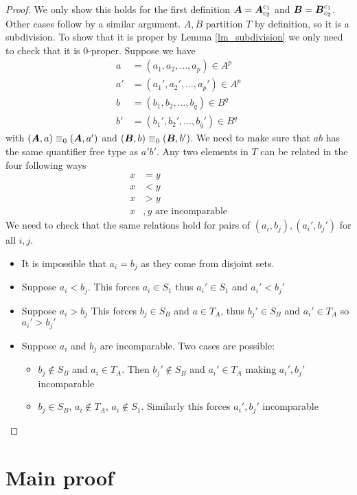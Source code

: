 \documentclass{amsart}
\DeclareMathOperator{\A}{\boldface A}
\DeclareMathOperator{\B}{\boldface B}
\begin{document}
\begin{proof}
	We only show this holds for the first definition $\A = \A^{c_1}_{c_2}$ and $\B = \B^{c_1}_{c_2}$. Other cases follow by a similar argument. $A,B$ partition $T$ by definition, so it is a subdivision. To show that it is proper by Lemma \ref{lm_subdivision} we only need to check that it is $0$-proper. Suppose we have 
	\begin{align*}
		a &= (a_1, a_2, \ldots, a_p) \in A^p \\
		a' &= (a_1', a_2', \ldots, a_p') \in A^p  \\
		b &= (b_1, b_2, \ldots, b_q) \in B^q  \\
		b' &= (b_1', b_2', \ldots, b_q') \in B^q 
	\end{align*}
	with $(\A, a) \equiv_0 (\A, a')$ and $(\B, b) \equiv_0 (\B, b')$. We need to make sure that $ab$ has the same quantifier free type as $a'b'$. Any two elements in $T$ can be related in the four following ways
	\begin{align*}
		x &= y \\
		x &< y \\
		x &> y \\
		x&,y \text{ are incomparable}
	\end{align*}
	We need to check that the same relations hold for pairs of $(a_i, b_j), (a_i', b_j')$ for all $i,j$.
	
	\begin{itemize}
		\item It is impossible that $a_i = b_j$ as they come from disjoint sets.
		\item Suppose $a_i < b_j$. This forces $a_i \in S_1$ thus $a_i' \in S_1$ and $a_i' < b_j'$ 
		\item Suppose $a_i > b_j$ This forces $b_j \in S_B$ and $a \in T_A$, thus $b_j' \in S_B$ and $a_i' \in T_A$ so $a_i' > b_j'$ 
		\item Suppose $a_i$ and $b_j$ are incomparable. Two cases are possible:
		\begin{itemize}
			\item $b_j \notin S_B$ and $a_i \in T_A$. Then $b_j' \notin S_B$ and $a_i' \in T_A$ making $a_i', b_j'$ incomparable
			\item $b_j \in S_B$, $a_i \notin T_A$, $a_i \notin S_1$. Similarly this forces $a_i', b_j'$ incomparable
		\end{itemize}
	\end{itemize}
\end{proof}

\section{Main proof}
\end{document}
